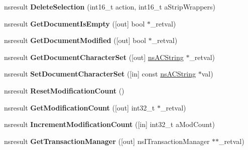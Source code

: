 \begin{DoxyCompactItemize}
\item 
\mbox{\label{interfacens_i_editor_acbc14ea539525bc865edbfed71a86753}} 
nsresult {\bfseries Delete\+Selection} (int16\+\_\+t action, int16\+\_\+t a\+Strip\+Wrappers)
\item 
\mbox{\label{interfacens_i_editor_ab9ae85f1887d2b7553a50fe8a5acaca1}} 
nsresult {\bfseries Get\+Document\+Is\+Empty} (\mbox{[}out\mbox{]} bool $\ast$\+\_\+retval)
\item 
\mbox{\label{interfacens_i_editor_a003f0995e38b9dfe202b8ba89d940e16}} 
nsresult {\bfseries Get\+Document\+Modified} (\mbox{[}out\mbox{]} bool $\ast$\+\_\+retval)
\item 
\mbox{\label{interfacens_i_editor_ae52b02f746b9e17de2319a4dc206428f}} 
nsresult {\bfseries Get\+Document\+Character\+Set} (\mbox{[}out\mbox{]} \hyperlink{structns_c_string_container}{ns\+A\+C\+String} $\ast$\+\_\+retval)
\item 
\mbox{\label{interfacens_i_editor_a038d3e5c0292ac090dcf7ff2eb9e64e9}} 
nsresult {\bfseries Set\+Document\+Character\+Set} (\mbox{[}in\mbox{]} const \hyperlink{structns_c_string_container}{ns\+A\+C\+String} $\ast$val)
\item 
\mbox{\label{interfacens_i_editor_a3f2e2f9199268e48e847e817436a0947}} 
nsresult {\bfseries Reset\+Modification\+Count} ()
\item 
\mbox{\label{interfacens_i_editor_a793e55c88c3d12ed9ea922bb48148f30}} 
nsresult {\bfseries Get\+Modification\+Count} (\mbox{[}out\mbox{]} int32\+\_\+t $\ast$\+\_\+retval)
\item 
\mbox{\label{interfacens_i_editor_a628f392df0a4fd19f81fd30d452f1939}} 
nsresult {\bfseries Increment\+Modification\+Count} (\mbox{[}in\mbox{]} int32\+\_\+t a\+Mod\+Count)
\item 
\mbox{\label{interfacens_i_editor_aba56eb22435f7d019ab135afda29232a}} 
nsresult {\bfseries Get\+Transaction\+Manager} (\mbox{[}out\mbox{]} ns\+I\+Transaction\+Manager $\ast$$\ast$\+\_\+retval)
$$
\end{DoxyCompactItemize}
